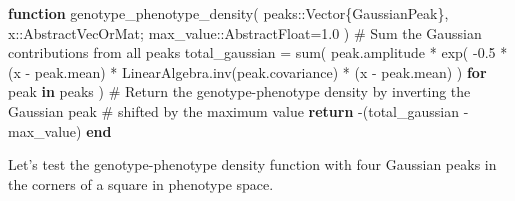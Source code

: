 \documentclass[
]{scrartcl}
\newenvironment{Shaded}{\begin{snugshade}}{\end{snugshade}}
\newcommand{\BuiltInTok}[1]{\textcolor[rgb]{0.00,0.23,0.31}{#1}}
\newcommand{\CharTok}[1]{\textcolor[rgb]{0.13,0.47,0.30}{#1}}
\newcommand{\CommentTok}[1]{\textcolor[rgb]{0.37,0.37,0.37}{#1}}
\newcommand{\ControlFlowTok}[1]{\textcolor[rgb]{0.00,0.23,0.31}{\textbf{#1}}}
\newcommand{\DataTypeTok}[1]{\textcolor[rgb]{0.68,0.00,0.00}{#1}}
\newcommand{\FloatTok}[1]{\textcolor[rgb]{0.68,0.00,0.00}{#1}}
\newcommand{\FunctionTok}[1]{\textcolor[rgb]{0.28,0.35,0.67}{#1}}
\newcommand{\KeywordTok}[1]{\textcolor[rgb]{0.00,0.23,0.31}{\textbf{#1}}}
\newcommand{\NormalTok}[1]{\textcolor[rgb]{0.00,0.23,0.31}{#1}}
\newcommand{\OperatorTok}[1]{\textcolor[rgb]{0.37,0.37,0.37}{#1}}
\begin{document}
\begin{Shaded}
\begin{Highlighting}[]
\KeywordTok{function} \FunctionTok{genotype\_phenotype\_density}\NormalTok{(}
\NormalTok{    peaks}\OperatorTok{::}\DataTypeTok{Vector\{GaussianPeak\}}\NormalTok{,}
\NormalTok{    x}\OperatorTok{::}\DataTypeTok{AbstractVecOrMat}\NormalTok{;}
\NormalTok{    max\_value}\OperatorTok{::}\DataTypeTok{AbstractFloat}\NormalTok{=}\FloatTok{1.0}
\NormalTok{)}
    \CommentTok{\# Sum the Gaussian contributions from all peaks}
\NormalTok{    total\_gaussian }\OperatorTok{=} \FunctionTok{sum}\NormalTok{(}
\NormalTok{        peak.amplitude }\OperatorTok{*}
        \FunctionTok{exp}\NormalTok{(}
            \OperatorTok{{-}}\FloatTok{0.5} \OperatorTok{*}
\NormalTok{            (x }\OperatorTok{{-}}\NormalTok{ peak.mean)}\CharTok{\textquotesingle{} *}
            \BuiltInTok{LinearAlgebra}\NormalTok{.}\FunctionTok{inv}\NormalTok{(peak.covariance) }\OperatorTok{*}
\NormalTok{            (x }\OperatorTok{{-}}\NormalTok{ peak.mean)}
\NormalTok{        )}
        \ControlFlowTok{for}\NormalTok{ peak }\KeywordTok{in}\NormalTok{ peaks}
\NormalTok{    )}
    \CommentTok{\# Return the genotype{-}phenotype density by inverting the Gaussian peak}
    \CommentTok{\# shifted by the maximum value}
    \ControlFlowTok{return} \FunctionTok{{-}}\NormalTok{(total\_gaussian }\OperatorTok{{-}}\NormalTok{ max\_value)}
\ControlFlowTok{end}
\end{Highlighting}
\end{Shaded}

Let's test the genotype-phenotype density function with four Gaussian
peaks in the corners of a square in phenotype space.
\end{document}
